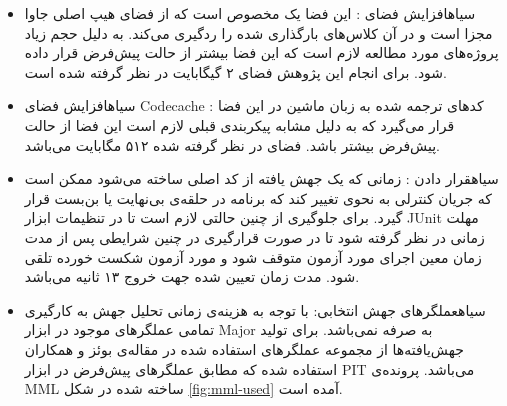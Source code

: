\begin{itemize}
	 \setlength{\itemsep}{1pt}
	\setlength{\parskip}{0pt}
	\setlength{\parsep}{0pt}

\item 
{}‌سیاه{افزایش فضای :}  
این فضا  یک  مخصوص است که از فضای هیپ اصلی جاوا مجزا است و در آن   کلاس‌های بارگذاری شده را ردگیری می‌کند. به دلیل حجم زیاد پروژه‌های مورد مطالعه لازم است که این فضا بیشتر از حالت پیش‌فرض قرار داده شود. برای انجام این پژوهش فضای ۲ گیگابایت در نظر گرفته شده است. 
\item
{}‌سیاه{افزایش فضای Codecache :} 
کدهای ترجمه شده به زبان ماشین در این فضا قرار می‌گیرد که به دلیل مشابه پیکربندی قبلی لازم است این فضا از حالت پیش‌فرض بیشتر باشد. فضای در نظر گرفته شده ۵۱۲ مگابایت می‌باشد. 
\item
{}‌سیاه{قرار دادن  :}
زمانی که یک جهش یافته از کد اصلی ساخته می‌شود ممکن است که جریان کنترلی به نحوی تغییر کند که برنامه در حلقه‌ی بی‌نهایت یا بن‌بست قرار گیرد. برای جلوگیری از چنین حالتی لازم است تا در تنظیمات ابزار JUnit  مهلت زمانی در نظر گرفته شود تا در صورت قرارگیری در چنین شرایطی پس از مدت زمان معین اجرای مورد آزمون متوقف شود و مورد آزمون شکست خورده تلقی شود. مدت زمان تعیین شده جهت خروج ۱۳ ثانیه می‌باشد. 
\item
{}‌سیاه{عملگرهای جهش انتخابی:}
با توجه به هزینه‌ی زمانی تحلیل جهش به کارگیری تمامی عملگرهای موجود در ابزار Major به صرفه نمی‌باشد. برای تولید جهش‌یافته‌ها از مجموعه عملگرهای استفاده شده در مقاله‌ی بوئز و همکاران\cite{bowes2016mutation} استفاده شده که مطابق عملگرهای پیش‌فرض در ابزار   PIT‌ می‌باشد. پرونده‌ی MML ساخته شده در شکل \ref{fig:mml-used} آمده است.


\end{itemize}
